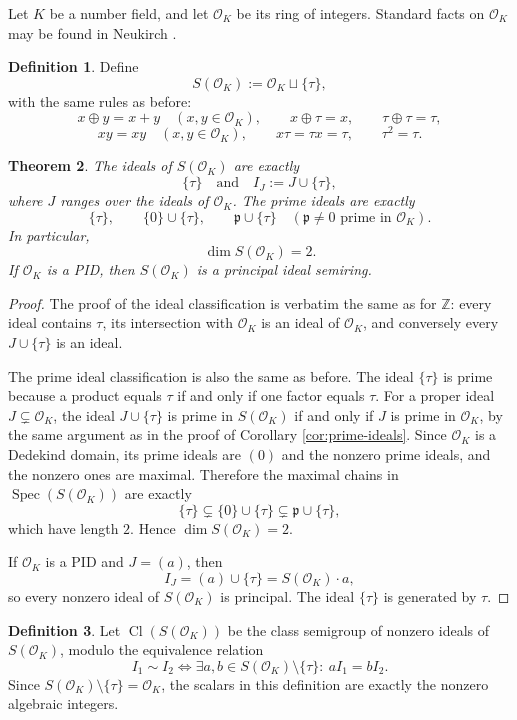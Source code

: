 \documentclass[11pt]{article}
\newtheorem{theorem}{Theorem}[section]
\theoremstyle{definition}
\newtheorem{definition}[theorem]{Definition}
\newcommand{\Z}{\mathbb Z}
\newcommand{\Spec}{\operatorname{Spec}}
\newcommand{\Cl}{\operatorname{Cl}}
\newcommand{\taup}{\tau}
\newcommand{\OK}{\mathcal O_K}
\begin{document}
Let \(K\) be a number field, and let \(\OK\) be its ring of integers.  Standard facts on \(\OK\) may be found in Neukirch \cite[Chs.~I--VII]{neukirch}.

\begin{definition}
Define
\[
S(\OK):=\OK\sqcup\{\taup\},
\]
with the same rules as before:
\[
x\oplus y=x+y\quad (x,y\in\OK),
\qquad
x\oplus\taup=x,
\qquad
\taup\oplus\taup=\taup,
\]
\[
xy=xy\quad (x,y\in\OK),
\qquad
x\taup=\taup x=\taup,
\qquad
\taup^2=\taup.
\]
\end{definition}

\begin{theorem}\label{thm:OK-ideals-spectrum}
The ideals of \(S(\OK)\) are exactly
\[
\{\taup\}
\quad\text{and}\quad
I_J:=J\cup\{\taup\},
\]
where \(J\) ranges over the ideals of \(\OK\).  The prime ideals are exactly
\[
\{\taup\},
\qquad
\{0\}\cup\{\taup\},
\qquad
\mathfrak p\cup\{\taup\}
\quad (\mathfrak p\neq0\text{ prime in }\OK).
\]
In particular,
\[
\dim S(\OK)=2.
\]
If \(\OK\) is a PID, then \(S(\OK)\) is a principal ideal semiring.
\end{theorem}

\begin{proof}
The proof of the ideal classification is verbatim the same as for \(\Z\): every ideal contains \(\taup\), its intersection with \(\OK\) is an ideal of \(\OK\), and conversely every \(J\cup\{\taup\}\) is an ideal.

The prime ideal classification is also the same as before.  The ideal \(\{\taup\}\) is prime because a product equals \(\taup\) if and only if one factor equals \(\taup\).  For a proper ideal \(J\subsetneq \OK\), the ideal \(J\cup\{\taup\}\) is prime in \(S(\OK)\) if and only if \(J\) is prime in \(\OK\), by the same argument as in the proof of Corollary \ref{cor:prime-ideals}.  Since \(\OK\) is a Dedekind domain, its prime ideals are \((0)\) and the nonzero prime ideals, and the nonzero ones are maximal.  Therefore the maximal chains in \(\Spec(S(\OK))\) are exactly
\[
\{\taup\}\subsetneq \{0\}\cup\{\taup\}\subsetneq \mathfrak p\cup\{\taup\},
\]
which have length \(2\).  Hence \(\dim S(\OK)=2\).

If \(\OK\) is a PID and \(J=(a)\), then
\[
I_J=(a)\cup\{\taup\}=S(\OK)\cdot a,
\]
so every nonzero ideal of \(S(\OK)\) is principal.  The ideal \(\{\taup\}\) is generated by \(\taup\).
\end{proof}

\begin{definition}
Let \(\Cl(S(\OK))\) be the class semigroup of nonzero ideals of \(S(\OK)\), modulo the equivalence relation
\[
I_1\sim I_2
\iff
\exists a,b\in S(\OK)\setminus\{\taup\}:\ aI_1=bI_2.
\]
Since \(S(\OK)\setminus\{\taup\}=\OK\), the scalars in this definition are exactly the nonzero algebraic integers.
\end{definition}
\end{document}
